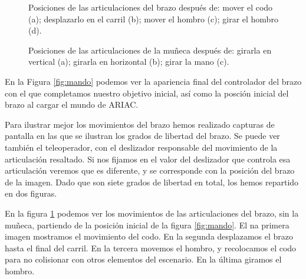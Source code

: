 \begin{figure}[]
	\centering
	\hspace{0.07\textwidth}	
	\hspace{0.07\textwidth}
	\caption[Ilustración de los grados de libertad del brazo.]{Posiciones de las articulaciones del brazo después de: mover el codo (a); desplazarlo en el carril (b); mover el hombro (c); girar el hombro (d).} \label{fig:posicionesbrazo1}
\end{figure}

\begin{figure}[]
	\centering
	\caption[Ilustración de los grados de libertad de la muñeca.]{Posiciones de las articulaciones de la muñeca después de: girarla en vertical (a); girarla en horizontal (b); girar la mano (c).} \label{fig:posicionesbrazo2}
\end{figure}

En la Figura \ref{fig:mando} podemos ver la apariencia final del controlador del brazo con el que completamos nuestro objetivo inicial, así como la posción inicial del brazo al cargar el mundo de ARIAC. 

Para ilustrar mejor los movimientos del brazo hemos realizado capturas de pantalla en las que se ilustran los grados de libertad del brazo. Se puede ver también el teleoperador, con el deslizador responsable del movimiento de la articulación resaltado. Si nos fijamos en el valor del deslizador que controla esa articulación veremos que es diferente, y se corresponde con la posición del brazo de la imagen. Dado que son siete grados de libertad en total, los hemos repartido en dos figuras. 

En la figura \ref{fig:posicionesbrazo1} podemos ver los movimientos de las articulaciones del brazo, sin la muñeca, partiendo de la posición inicial de la figura \ref{fig:mando}. El na primera imagen mostramos el movimiento del codo. En la segunda desplazamos el brazo hasta el final del carril. En la tercera movemos el hombro, y recolocamos el codo para no colisionar con otros elementos del escenario. En la última giramos el hombro.

